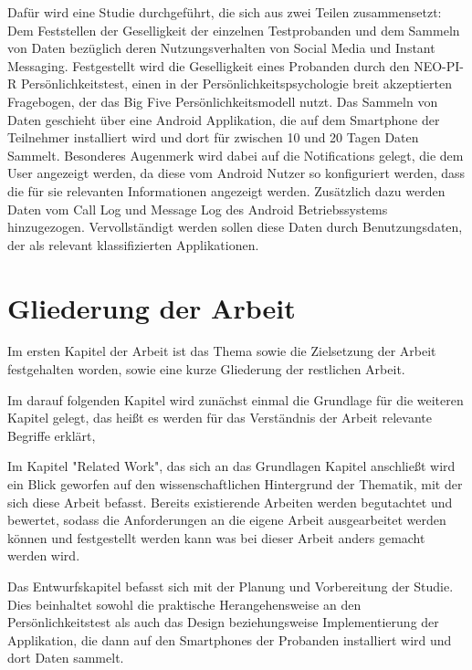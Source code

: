 Dafür wird eine Studie durchgeführt, die sich aus zwei Teilen zusammensetzt:
Dem Feststellen der Geselligkeit der einzelnen Testprobanden und dem Sammeln von Daten bezüglich deren Nutzungsverhalten von Social Media und Instant Messaging. 
Festgestellt wird die Geselligkeit eines Probanden durch den NEO-PI-R Persönlichkeitstest, einen in der Persönlichkeitspsychologie breit akzeptierten Fragebogen, der das Big Five Persönlichkeitsmodell nutzt.
Das Sammeln von Daten geschieht über eine Android Applikation, die auf dem Smartphone der Teilnehmer installiert wird und dort für zwischen 10 und 20 Tagen Daten Sammelt.
Besonderes Augenmerk wird dabei auf die Notifications gelegt, die dem User angezeigt werden, da diese vom Android Nutzer so konfiguriert werden, dass die für sie relevanten Informationen angezeigt werden.
Zusätzlich dazu werden Daten vom Call Log und Message Log des Android Betriebssystems hinzugezogen.
Vervollständigt werden sollen diese Daten durch Benutzungsdaten, der als relevant klassifizierten Applikationen.


\section{Gliederung der Arbeit}
\label{ch:Einleitung:sec:Gliederung}

Im ersten Kapitel der Arbeit ist das Thema sowie die Zielsetzung der Arbeit festgehalten worden, sowie eine kurze Gliederung der restlichen Arbeit.
\par

Im darauf folgenden Kapitel wird zunächst einmal die Grundlage für die weiteren Kapitel gelegt, das heißt
es werden für das Verständnis der Arbeit relevante Begriffe erklärt, 
\par


Im Kapitel "Related Work", das sich an das Grundlagen Kapitel anschließt wird ein Blick geworfen auf den wissenschaftlichen Hintergrund der Thematik,
 mit der sich diese Arbeit befasst.
Bereits existierende Arbeiten werden begutachtet und bewertet, sodass die Anforderungen an die eigene Arbeit ausgearbeitet werden können und festgestellt werden kann was bei dieser Arbeit anders gemacht werden wird.
\par

Das Entwurfskapitel befasst sich mit der Planung und Vorbereitung der Studie.
Dies beinhaltet sowohl die praktische Herangehensweise an den Persönlichkeitstest als auch das Design beziehungsweise Implementierung der Applikation,
die dann auf den Smartphones der Probanden installiert wird und dort Daten sammelt. 

